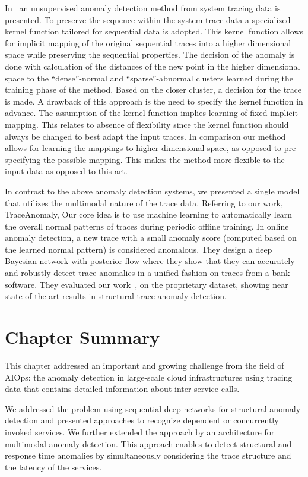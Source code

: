 In~\cite{eskin2002geometric} an unsupervised anomaly detection method from system tracing data is presented. To preserve the sequence within the system trace data a specialized kernel function tailored for sequential data is adopted. This kernel function allows for implicit mapping of the original sequential traces into a higher dimensional space while preserving the sequential properties. The decision of the anomaly is done with calculation of the distances of the new point in the higher dimensional space to the “dense”-normal and “sparse”-abnormal clusters learned during the training phase of the method. Based on the closer cluster, a decision for the trace is made. 
A drawback of this approach is the need to specify the kernel function in advance. The assumption of the kernel function implies learning of fixed implicit mapping. This relates to absence of flexibility since the kernel function should always be changed to best adapt the input traces. In comparison our method allows for learning the mappings to higher dimensional space, as opposed to pre-specifying the possible mapping. This makes the method more flexible to the input data as opposed to this art.  

In contrast to the above anomaly detection systems, we presented a single model that utilizes the multimodal nature of the trace data. Referring to our work, TraceAnomaly, Our core idea
is to use machine learning to automatically learn the overall normal patterns of traces during periodic offline training. In online anomaly detection, a new trace with a small anomaly score (computed based on the learned normal pattern) is considered anomalous. They design a deep Bayesian network with posterior flow where they show that they can accurately and robustly detect trace anomalies in a unified fashion on traces from a bank software. They evaluated our work~\cite{nedelkoski2019anomalymultimodal}, on the proprietary dataset, showing near state-of-the-art results in structural trace anomaly detection.

\section{Chapter Summary} \label{conclusion}
This chapter addressed an important and growing challenge from the field of AIOps: the anomaly detection in large-scale cloud infrastructures using tracing data that contains detailed information about inter-service calls.

We addressed the problem using sequential deep networks for structural anomaly detection and  presented approaches to recognize dependent or concurrently invoked services. We further extended the approach by an architecture for multimodal anomaly detection. This approach enables to detect structural and response time anomalies by simultaneously considering the trace structure and the latency of the services.   


